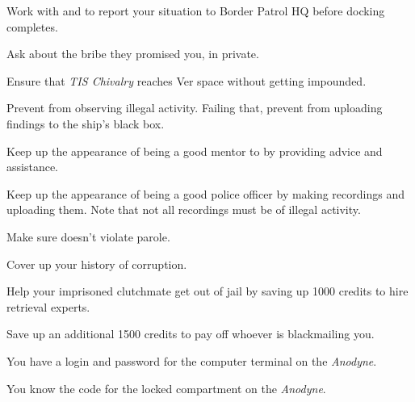 \documentclass[char]{guildcamp4}
\begin{document}
\begin{itemz}[Goals]
	\item Work with \cCgood{} and \cPilot{} to report your situation to Border Patrol HQ before docking completes.
	\item Ask \cVone{} about the bribe they promised you, in private.
	\item Ensure that \emph{TIS Chivalry} reaches Ver space without getting impounded.
	\item Prevent \cCgood{} from observing illegal activity. Failing that, prevent \cCgood{\them} from uploading \cCgood{\their} findings to the ship's black box.
	\item Keep up the appearance of being a good mentor to \cCgood{} by providing advice and assistance.
	\item Keep up the appearance of being a good police officer by making recordings and uploading them. Note that not all recordings must be of illegal activity.
	\item Make sure \cPilot{} doesn't violate  parole. 
	\item Cover up your history of corruption.
	\item Help your imprisoned clutchmate get out of jail by saving up 1000 credits to hire retrieval experts.
	\item Save up an additional 1500 credits to pay off whoever is blackmailing you.

\end{itemz}

\begin{itemz}[Notes]
	\item You have a login and password for the computer terminal on the \emph{Anodyne}.
	\item You know the code for the locked compartment on the \emph{Anodyne}.
\end{itemz}

\begin{contacts}
	\contact{\cCgood{}}
	\contact{\cPilot{}}
	\contact{\cVone{}}
\end{contacts}
\end{document}
